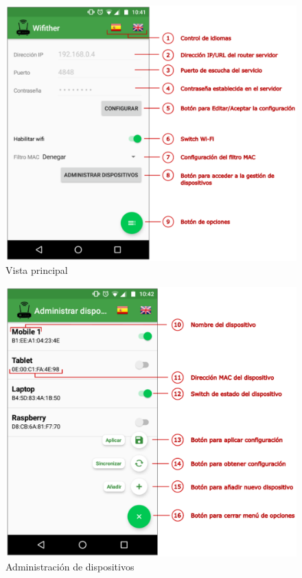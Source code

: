 \documentclass[12pt]{article}
\begin{document}
        \begin{figure}[h!]
            \centering
                \includegraphics[scale=0.5]{main_activity_manual.eps}
                \caption{Vista principal}
                \label{fig:main_activity_manual}
        \end{figure}

        \begin{figure}[h!]
            \centering
                \includegraphics[scale=0.5]{devices_activity_manual.eps}
                \caption{Administración de dispositivos}
                \label{fig:devices_activity_manual}
        \end{figure}
\end{document}
